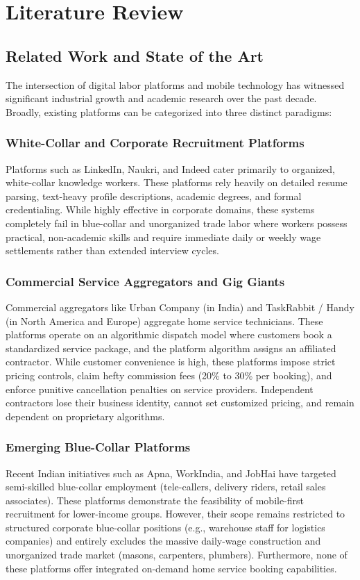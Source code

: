 \newpage
\chapter{Literature Review}

\section{Related Work and State of the Art}
The intersection of digital labor platforms and mobile technology has witnessed significant industrial growth and academic research over the past decade. Broadly, existing platforms can be categorized into three distinct paradigms:

\subsection{White-Collar and Corporate Recruitment Platforms}
Platforms such as LinkedIn, Naukri, and Indeed cater primarily to organized, white-collar knowledge workers. These platforms rely heavily on detailed resume parsing, text-heavy profile descriptions, academic degrees, and formal credentialing. While highly effective in corporate domains, these systems completely fail in blue-collar and unorganized trade labor where workers possess practical, non-academic skills and require immediate daily or weekly wage settlements rather than extended interview cycles.

\subsection{Commercial Service Aggregators and Gig Giants}
Commercial aggregators like Urban Company (in India) and TaskRabbit / Handy (in North America and Europe) aggregate home service technicians. These platforms operate on an algorithmic dispatch model where customers book a standardized service package, and the platform algorithm assigns an affiliated contractor. While customer convenience is high, these platforms impose strict pricing controls, claim hefty commission fees (20\% to 30\% per booking), and enforce punitive cancellation penalties on service providers. Independent contractors lose their business identity, cannot set customized pricing, and remain dependent on proprietary algorithms.

\subsection{Emerging Blue-Collar Platforms}
Recent Indian initiatives such as Apna, WorkIndia, and JobHai have targeted semi-skilled blue-collar employment (tele-callers, delivery riders, retail sales associates). These platforms demonstrate the feasibility of mobile-first recruitment for lower-income groups. However, their scope remains restricted to structured corporate blue-collar positions (e.g., warehouse staff for logistics companies) and entirely excludes the massive daily-wage construction and unorganized trade market (masons, carpenters, plumbers). Furthermore, none of these platforms offer integrated on-demand home service booking capabilities.

